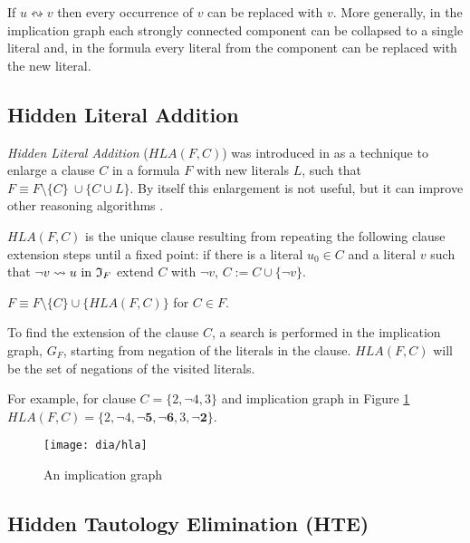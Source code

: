 \begin{myprop}
  If $u \leftrightsquigarrow v$ then every occurrence of $v$ can be replaced
  with $v$. More generally, in the implication graph each strongly
  connected component can be collapsed to a single literal and, in
  the formula every literal from the component can be replaced with
  the new literal.
\end{myprop}


\subsection{Hidden Literal Addition}
\label{ssec:hla}

\emph{Hidden Literal Addition} ($HLA(F, C)$) was introduced in
\cite{mine:hjb_efficient} as a technique to enlarge a clause $C$
in a formula $F$ with new literals $L$, such that $F \equiv F \setminus \{C\} \
\cup \{ C \cup L \}$. By itself this enlargement is not useful, but it
can improve other reasoning algorithms \cite{Heule:2010:CEP:1928380.1928406, Heule_coveredclause}.

\begin{mydef}
  $HLA(F, C)$ is the unique clause resulting from repeating the following
  clause extension steps until a fixed point: if there is a literal $u_0 \in C$
  and a literal $v$ such that $\neg v \rightsquigarrow u \text{ in } \mathfrak{I}_F$
  extend $C$ with $\neg v$, $C := C \cup \{ \neg v \}$.
\end{mydef}

\begin{myprop}
  $F \equiv F \setminus \{C\} \cup \{HLA(F, C)\}$ for $C \in F$.
\end{myprop}

To find the extension of the clause $C$, a search is performed in the
implication graph, $G_F$, starting from negation of the literals in
the clause. $HLA(F, C)$ will be the set of negations of the visited
literals.

For example, for clause $C = \{ 2, \neg 4, 3\}$
and implication graph in Figure \ref{fig:hla}
$HLA(F, C) = \{2, \neg 4, \mathbf{\neg 5, \neg 6}, 3, \mathbf{\neg 2} \}$.

\begin{figure}
  \centering
  \texttt{[image: dia/hla]}
  \caption{An implication graph}
  \label{fig:hla}
\end{figure}


\subsection{Hidden Tautology Elimination (HTE)}
\label{ssec:hte}

